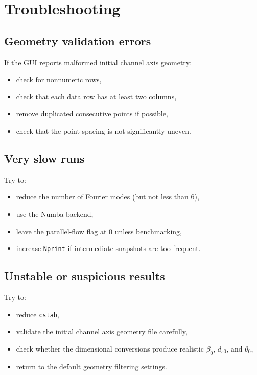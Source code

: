 \documentclass[11pt,a4paper]{article}
\begin{document}
\section{Troubleshooting}

\subsection{Geometry validation errors}

If the GUI reports malformed initial channel axis geometry:

\begin{itemize}[leftmargin=1.2em]
	\item check for nonnumeric rows,
	\item check that each data row has at least two columns,
	\item remove duplicated consecutive points if possible,
	\item check that the point spacing is not significantly uneven.
\end{itemize}

\subsection{Very slow runs}

Try to:

\begin{itemize}[leftmargin=1.2em]
	\item reduce the number of Fourier modes (but not less than 6),
	\item use the Numba backend,
	\item leave the parallel-flow flag at 0 unless benchmarking,
	\item increase \texttt{Nprint} if intermediate snapshots are too frequent.
\end{itemize}

\subsection{Unstable or suspicious results}

Try to:

\begin{itemize}[leftmargin=1.2em]
	\item reduce \texttt{cstab},
	\item validate the initial channel axis geometry file carefully,
	\item check whether the dimensional conversions produce realistic $\beta_0$, $d_{s0}$, and $\theta_0$,
	\item return to the default geometry filtering settings.
\end{itemize}
\end{document}
